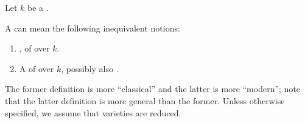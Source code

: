 \begin{definition} \label{definition:variety_over_a_field}
Let $k$ be a . 

A  can mean the following inequivalent notions:
\begin{enumerate}
    \item {},  of  over $k$.

    \item A  of  over $k$, possibly also .
\end{enumerate}

The former definition is more ``classical'' and the latter is more ``modern''; note that the latter definition is more general than the former. Unless otherwise specified, we assume that varieties are reduced.


\end{definition}
